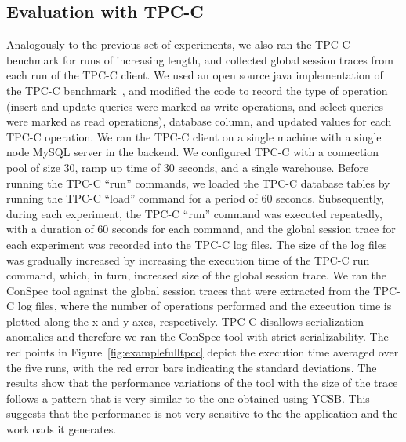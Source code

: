 \documentclass[journal, compsoc]{IEEEtran}
\begin{document}
	\subsection{Evaluation with TPC-C}\label{sec:evaltpcc}
	Analogously to the previous set of experiments, we also ran the TPC-C benchmark for runs of increasing length, and collected global session traces from each run of the TPC-C client. We used an open source java implementation of the TPC-C benchmark~\cite{Tpcc2015}, and modified the code to record the type of operation  (insert and update queries were marked as write operations, and select queries were marked as read operations), database column, and updated values for each TPC-C operation.  We ran the TPC-C client on a single  machine with a single node MySQL server in the backend. We configured TPC-C with a connection pool of size 30, ramp up time of 30 seconds, and a single warehouse. Before running the TPC-C ``run'' commands, we loaded the TPC-C database tables by running the TPC-C ``load'' command for a period of 60 seconds. Subsequently,  during each experiment, the TPC-C ``run'' command was executed repeatedly, with a duration of 60 seconds for each command, and the global session trace for each experiment was recorded into the TPC-C log files. The size of the log files was gradually increased by increasing the execution time of the TPC-C run command, which, in turn, increased size of the global session trace.  We ran the ConSpec tool against the global session traces that were extracted from the TPC-C log files, where the number of operations performed and the execution time is plotted along the x and y axes, respectively. TPC-C  disallows serialization anomalies and therefore we ran the ConSpec tool with strict serializability. The red points in Figure~\ref{fig:examplefulltpcc} depict the execution time averaged over the five runs, with the red error bars indicating the standard deviations.
	The results show that the performance variations of the tool with the size of the trace follows a pattern that is very similar to the one obtained using YCSB. This suggests that the performance is not very sensitive to the the application and the workloads it generates.
	
\end{document}
